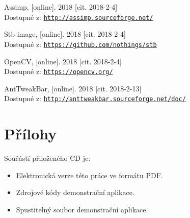 \documentclass[czech,public,dept460,male,cpdeclaration]{diploma}
\begin{document}
\begin{thebibliography}{99}
	 Assimp,
		[online]. 2018 [cit. 2018-2-4]\\
		Dostupné z: \href{http://assimp.sourceforge.net/}{\texttt{http://assimp.sourceforge.net/}}
		
	 Stb image,
		[online]. 2018 [cit. 2018-2-4]\\
		Dostupné z: \href{https://github.com/nothings/stb}{\texttt{https://github.com/nothings/stb}}
		
	 OpenCV,
		[online]. 2018 [cit. 2018-2-4]\\
		Dostupné z: \href{https://opencv.org/}{\texttt{https://opencv.org/}}
		
	 AntTweakBar,
		[online]. 2018 [cit. 2018-2-13]\\
		Dostupné z: \href{http://anttweakbar.sourceforge.net/doc/}{\texttt{http://anttweakbar.sourceforge.net/doc/}}
		
\end{thebibliography}


\appendix
\section{Přílohy}

Součástí přiloženého CD je:

\begin{itemize}
	\item Elektronická verze této práce ve formátu PDF.
	\item Zdrojové kódy demonstrační aplikace.
	\item Spustitelný soubor demonstrační aplikace.
\end{itemize}
\end{document}
